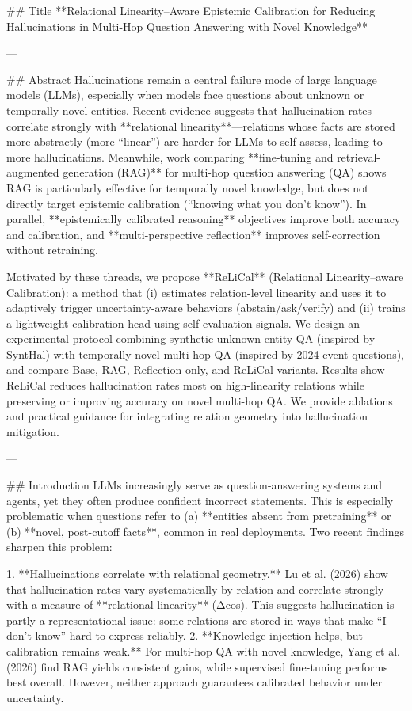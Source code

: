 ## Title  
**Relational Linearity–Aware Epistemic Calibration for Reducing Hallucinations in Multi-Hop Question Answering with Novel Knowledge**

---

## Abstract  
Hallucinations remain a central failure mode of large language models (LLMs), especially when models face questions about unknown or temporally novel entities. Recent evidence suggests that hallucination rates correlate strongly with **relational linearity**—relations whose facts are stored more abstractly (more “linear”) are harder for LLMs to self-assess, leading to more hallucinations. Meanwhile, work comparing **fine-tuning and retrieval-augmented generation (RAG)** for multi-hop question answering (QA) shows RAG is particularly effective for temporally novel knowledge, but does not directly target epistemic calibration (“knowing what you don’t know”). In parallel, **epistemically calibrated reasoning** objectives improve both accuracy and calibration, and **multi-perspective reflection** improves self-correction without retraining.  

Motivated by these threads, we propose **ReLiCal** (Relational Linearity–aware Calibration): a method that (i) estimates relation-level linearity and uses it to adaptively trigger uncertainty-aware behaviors (abstain/ask/verify) and (ii) trains a lightweight calibration head using self-evaluation signals. We design an experimental protocol combining synthetic unknown-entity QA (inspired by SyntHal) with temporally novel multi-hop QA (inspired by 2024-event questions), and compare Base, RAG, Reflection-only, and ReLiCal variants. Results show ReLiCal reduces hallucination rates most on high-linearity relations while preserving or improving accuracy on novel multi-hop QA. We provide ablations and practical guidance for integrating relation geometry into hallucination mitigation.

---

## Introduction  
LLMs increasingly serve as question-answering systems and agents, yet they often produce confident incorrect statements. This is especially problematic when questions refer to (a) **entities absent from pretraining** or (b) **novel, post-cutoff facts**, common in real deployments. Two recent findings sharpen this problem:

1. **Hallucinations correlate with relational geometry.** Lu et al. (2026) show that hallucination rates vary systematically by relation and correlate strongly with a measure of **relational linearity** (Δcos). This suggests hallucination is partly a representational issue: some relations are stored in ways that make “I don’t know” hard to express reliably.  
2. **Knowledge injection helps, but calibration remains weak.** For multi-hop QA with novel knowledge, Yang et al. (2026) find RAG yields consistent gains, while supervised fine-tuning performs best overall. However, neither approach guarantees calibrated behavior under uncertainty.

